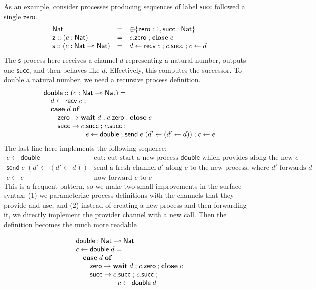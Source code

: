 \documentclass[submission,copyright,creativecommons]{eptcs}
\newcommand{\m}[1]{\mathsf{#1}}
\newcommand{\mb}[1]{\mbox{\bf #1}}
\newcommand{\semi}{\mathrel{;}}
\begin{document}
As an example, consider processes producing sequences of label $\m{succ}$ followed a single $\m{zero}$.
\[
\begin{array}{lcl}
\m{Nat} & = & \oplus\{\m{zero} : \terminate, \m{succ} : \m{Nat}\} \\
\m{z} :: (c:\m{Nat}) & = & c.\m{zero} \semi \mb{close}\; c \\
\m{s} :: (c:\m{Nat} \lolli \m{Nat}) & = & d \leftarrow \m{recv}\; c \semi c.\m{succ} \semi c \leftarrow d
\end{array}
\]
The $\m{s}$ process here receives a channel $d$ representing a natural number, outputs one $\m{succ}$, and then behaves like $d$.  Effectively, this computes the successor.  To double a natural number, we need a recursive process definition.
\[
\begin{array}{l}
\m{double} :: (c:\m{Nat} \lolli \m{Nat}) = \\
\quad d \leftarrow \m{recv}\; c \semi \\
\quad \mb{case}\; d\; \mb{of} \\
\quad\quad \m{zero} \rightarrow \mb{wait}\; d \semi c.\m{zero} \semi \mb{close}\; c \\
\quad\quad \m{succ} \rightarrow c.\m{succ} \semi c.\m{succ} \semi \\
\hspace{6em} e \leftarrow \m{double} \semi \m{send}\; e\; (d' \leftarrow (d' \leftarrow d)) \semi c \leftarrow e
\end{array}
\]
The last line here implements the following sequence:
\[
\begin{array}{ll}
e \leftarrow \m{double} & \mbox{cut: cut start a new process $\m{double}$ which provides along the new $e$} \\
\m{send}\; e\; (d' \leftarrow (d' \leftarrow d)) & \mbox{send a fresh channel $d'$ along $e$ to the new process,
where $d'$ forwards $d$} \\
c \leftarrow e & \mbox{now forward $e$ to $c$}
\end{array}
\]
This is a frequent pattern, so we make two small improvements in the surface syntax: (1) we parameterize process definitions with the channels that they provide and use, and (2) instead of creating a new process and then forwarding it, we directly implement the provider channel with a new call. Then the definition becomes the much more readable

\[
\begin{array}{l}
\m{double} : \m{Nat} \lolli \m{Nat} \\
c \leftarrow \m{double}\; d = \\
\quad \mb{case}\; d\; \mb{of} \\
\quad\quad \m{zero} \rightarrow \mb{wait}\; d \semi c.\m{zero} \semi \mb{close}\; c \\
\quad\quad \m{succ} \rightarrow c.\m{succ} \semi c.\m{succ} \semi \\
\hspace{6em} c \leftarrow \m{double}\; d
\end{array}
\]
\end{document}
